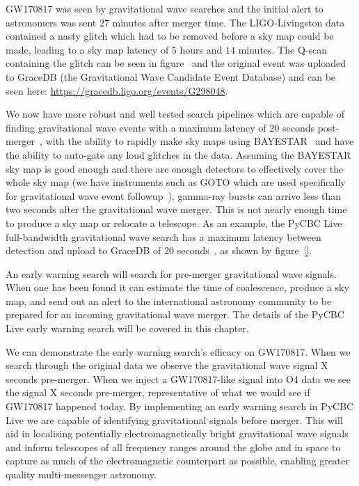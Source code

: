 GW170817 was seen by gravitational wave searches and the initial alert to astronomers was sent $27$ minutes after merger time. The LIGO-Livingston data contained a nasty glitch which had to be removed before a sky map could be made, leading to a sky map latency of $5$ hours and $14$ minutes. The Q-scan containing the glitch can be seen in figure~\cite{} and the original event was uploaded to GraceDB (the Gravitational Wave Candidate Event Database) and can be seen here: \href{https://gracedb.ligo.org/events/G298048}{https://gracedb.ligo.org/events/G298048}.

We now have more robust and well tested search pipelines which are capable of finding gravitational wave events with a maximum latency of $20$ seconds post-merger~\cite{PyCBC_live}, with the ability to rapidly make sky maps using BAYESTAR~\cite{BAYEstar} and have the ability to auto-gate any loud glitches in the data. Assuming the BAYESTAR sky map is good enough and there are enough detectors to effectively cover the whole sky map (we have instruments such as GOTO which are used specifically for gravitational wave event followup~\cite{}), gamma-ray bursts can arrive less than two seconds after the gravitational wave merger. This is not nearly enough time to produce a sky map or relocate a telescope. As an example, the PyCBC Live full-bandwidth gravitational wave search has a maximum latency between detection and upload to GraceDB of $20$ seconds~\cite{}, as shown by figure~\ref{}.

An early warning search will search for pre-merger gravitational wave signals. When one has been found it can estimate the time of coalescence, produce a sky map, and send out an alert to the international astronomy community to be prepared for an incoming gravitational wave merger. The details of the PyCBC Live early warning search will be covered in this chapter.

We can demonstrate the early warning search's efficacy on GW170817. When we search through the original data we observe the gravitational wave signal X seconds pre-merger. When we inject a GW170817-like signal into O4 data we see the signal X seconds pre-merger, representative of what we would see if GW170817 happened today. By implementing an early warning search in PyCBC Live we are capable of identifying gravitational signals before merger. This will aid in localising potentially electromagnetically bright gravitational wave signals and inform telescopes of all frequency ranges around the globe and in space to capture as much of the electromagnetic counterpart as possible, enabling greater quality multi-messenger astronomy.

